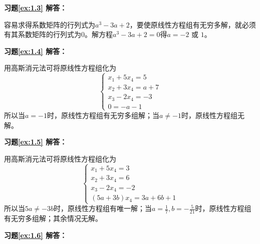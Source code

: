 \documentclass[a4paper]{book}
\begin{document}
\vspace{1.5em}

\textbf{习题\ref{ex:1.3} 解答：}

容易求得系数矩阵的行列式为$a^3 - 3a + 2$，要使原线性方程组有无穷多解，就必须有其系数矩阵的行列式为0。解方程$a^3 - 3a + 2 = 0$得$a = -2$ 或 $1$。

\vspace{1.5em}

\textbf{习题\ref{ex:1.4} 解答：}

用高斯消元法可将原线性方程组化为
$$\begin{cases} x_1 + 5x_4 = 5 \\ x_2 + 3x_4 = a+7 \\ x_3 - 2x_4 = -3 \\ 0 = -a-1 \end{cases}$$
所以当$a = -1$时，原线性方程组有无穷多组解；当$a\neq -1$时，原线性方程组无解。

\vspace{1.5em}

\textbf{习题\ref{ex:1.5} 解答：}

用高斯消元法可将原线性方程组化为
$$\begin{cases} x_1 + 5x_4 = 3 \\ x_2 + 3x_4 = 6 \\ x_3 - 2x_4 = -2 \\ (5 a + 3 b)x_4 = 3 a + 6 b + 1 \end{cases}$$
所以当$5a \neq -3b$时，原线性方程组有唯一解；当$a = \frac17, b = -\frac{5}{21}$时，原线性方程组有无穷多组解；其余情况无解。

\vspace{1.5em}

\textbf{习题\ref{ex:1.6} 解答：}
\end{document}
